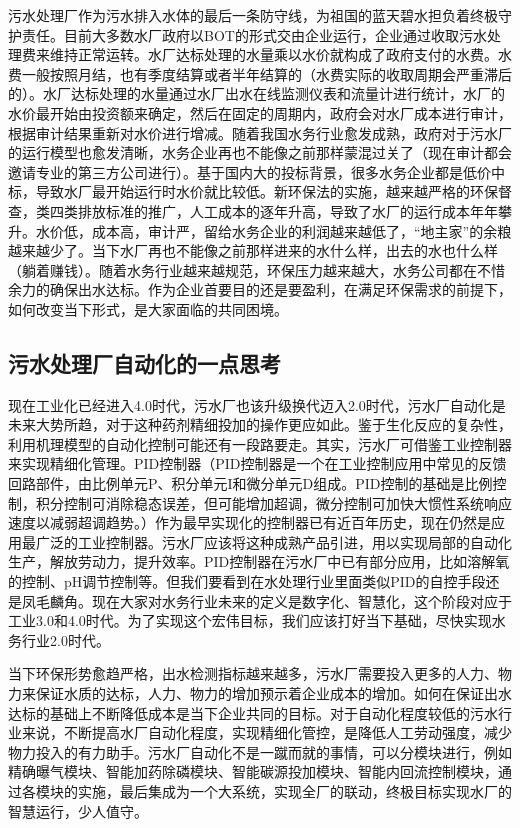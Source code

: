 \documentclass[
]{book}
\begin{document}
污水处理厂作为污水排入水体的最后一条防守线，为祖国的蓝天碧水担负着终极守护责任。目前大多数水厂政府以BOT的形式交由企业运行，企业通过收取污水处理费来维持正常运转。水厂达标处理的水量乘以水价就构成了政府支付的水费。水费一般按照月结，也有季度结算或者半年结算的（水费实际的收取周期会严重滞后的）。水厂达标处理的水量通过水厂出水在线监测仪表和流量计进行统计，水厂的水价最开始由投资额来确定，然后在固定的周期内，政府会对水厂成本进行审计，根据审计结果重新对水价进行增减。随着我国水务行业愈发成熟，政府对于污水厂的运行模型也愈发清晰，水务企业再也不能像之前那样蒙混过关了（现在审计都会邀请专业的第三方公司进行）。基于国内大的投标背景，很多水务企业都是低价中标，导致水厂最开始运行时水价就比较低。新环保法的实施，越来越严格的环保督查，类四类排放标准的推广，人工成本的逐年升高，导致了水厂的运行成本年年攀升。水价低，成本高，审计严，留给水务企业的利润越来越低了，``地主家''的余粮越来越少了。当下水厂再也不能像之前那样进来的水什么样，出去的水也什么样（躺着赚钱）。随着水务行业越来越规范，环保压力越来越大，水务公司都在不惜余力的确保出水达标。作为企业首要目的还是要盈利，在满足环保需求的前提下，如何改变当下形式，是大家面临的共同困境。

\hypertarget{ux6c61ux6c34ux5904ux7406ux5382ux81eaux52a8ux5316ux7684ux4e00ux70b9ux601dux8003}{%
\subsection{污水处理厂自动化的一点思考}\label{ux6c61ux6c34ux5904ux7406ux5382ux81eaux52a8ux5316ux7684ux4e00ux70b9ux601dux8003}}

现在工业化已经进入4.0时代，污水厂也该升级换代迈入2.0时代，污水厂自动化是未来大势所趋，对于这种药剂精细投加的操作更应如此。鉴于生化反应的复杂性，利用机理模型的自动化控制可能还有一段路要走。其实，污水厂可借鉴工业控制器来实现精细化管理。PID控制器（PID控制器是一个在工业控制应用中常见的反馈回路部件，由比例单元P、积分单元I和微分单元D组成。PID控制的基础是比例控制，积分控制可消除稳态误差，但可能增加超调，微分控制可加快大惯性系统响应速度以减弱超调趋势。）作为最早实现化的控制器已有近百年历史，现在仍然是应用最广泛的工业控制器。污水厂应该将这种成熟产品引进，用以实现局部的自动化生产，解放劳动力，提升效率。PID控制器在污水厂中已有部分应用，比如溶解氧的控制、pH调节控制等。但我们要看到在水处理行业里面类似PID的自控手段还是凤毛麟角。现在大家对水务行业未来的定义是数字化、智慧化，这个阶段对应于工业3.0和4.0时代。为了实现这个宏伟目标，我们应该打好当下基础，尽快实现水务行业2.0时代。

当下环保形势愈趋严格，出水检测指标越来越多，污水厂需要投入更多的人力、物力来保证水质的达标，人力、物力的增加预示着企业成本的增加。如何在保证出水达标的基础上不断降低成本是当下企业共同的目标。对于自动化程度较低的污水行业来说，不断提高水厂自动化程度，实现精细化管控，是降低人工劳动强度，减少物力投入的有力助手。污水厂自动化不是一蹴而就的事情，可以分模块进行，例如精确曝气模块、智能加药除磷模块、智能碳源投加模块、智能内回流控制模块，通过各模块的实施，最后集成为一个大系统，实现全厂的联动，终极目标实现水厂的智慧运行，少人值守。
\end{document}

